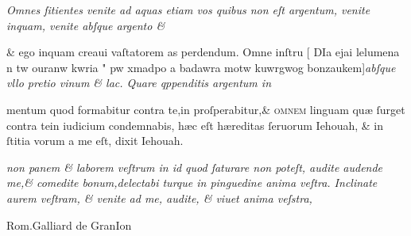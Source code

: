 \documentclass{article}
\begin{document}
{\begin{multicols}{2}
	\columnbreak
	\justifying
	\noindent
	\textit{Omnes ſitientes venite ad aquas etiam vos quibus non eſt argentum, venite inquam, venite abſque argento {\&}\\}
\end{multicols}
\fontsize{6.25}{7}\selectfont
\vspace{-2.7\baselineskip}
\noindent \& ego inquam creaui vaſtatorem as perdendum. Omne inſtru \hfill[\hfill %
	{\grecs DIa ejai lelumena n tw ouranw kwria " pw xmadpo a badawra motw kuwrgwog bonzaukem}\hfill]\hfill \textit{abſque vllo pretio vinum \& lac. Quare qppenditis argentum in}
\vspace{-1.6\baselineskip}
\begin{multicols}{2}
	\fontsize{6.25}{7}\selectfont
	\justifying
	\noindent mentum quod formabitur contra te,in proſperabitur,\& \textsc{ omnem} linguam qu\ae{} ſurget contra tein iudicium\linebreak
	condemnabis, h\ae{}c eſt h\ae{}reditas ſeruorum Iehouah, \& in ſtitia vorum a me eſt, dixit Iehouah.

	\columnbreak
	\justifying
	\noindent
	\textit{non panem \& laborem veſtrum in id quod ſaturare non poteſt, audite audende me,\& comedite bonum,delectabi\linebreak
		turque in pinguedine anima veſtra. Inclinate aurem veſtram, \& venite ad me, audite, \& viuet anima veſstra,\linebreak
	}
\end{multicols}
\vspace{-3.5\baselineskip}
\setlength{\columnsep}{3mm}
\begin{multicols}{4}
	\tiny
	\centering
	Rom.Galliard de GranIon\\
	\vspace{\baselineskip}
	\fontsize{4}{4.5}\selectfont
	\justifying
	\noindent {}


\end{multicols}}
\end{document}
